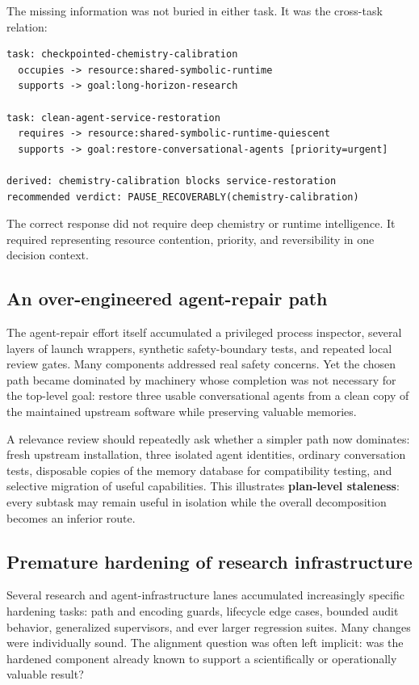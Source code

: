 \documentclass[11pt,letterpaper]{article}
\newcommand{\term}[1]{\textbf{#1}}
\begin{document}
The missing information was not buried in either task. It was the cross-task
relation:

\begin{lstlisting}[style=plain]
task: checkpointed-chemistry-calibration
  occupies -> resource:shared-symbolic-runtime
  supports -> goal:long-horizon-research

task: clean-agent-service-restoration
  requires -> resource:shared-symbolic-runtime-quiescent
  supports -> goal:restore-conversational-agents [priority=urgent]

derived: chemistry-calibration blocks service-restoration
recommended verdict: PAUSE_RECOVERABLY(chemistry-calibration)
\end{lstlisting}

The correct response did not require deep chemistry or runtime intelligence.
It required representing resource contention, priority, and reversibility in
one decision context.

\subsection{An over-engineered agent-repair path}

The agent-repair effort itself accumulated a privileged process inspector,
several layers of launch wrappers, synthetic safety-boundary tests, and
repeated local review gates. Many components addressed real safety concerns.
Yet the chosen path became dominated by machinery whose completion was not
necessary for the top-level goal: restore three usable conversational agents
from a clean copy of the maintained upstream software while preserving
valuable memories.

A relevance review should repeatedly ask whether a simpler path now dominates:
fresh upstream installation, three isolated agent identities, ordinary
conversation tests, disposable copies of the memory database for compatibility
testing, and selective migration of useful capabilities.
This illustrates \term{plan-level staleness}: every subtask may remain useful
in isolation while the overall decomposition becomes an inferior route.

\subsection{Premature hardening of research infrastructure}

Several research and agent-infrastructure lanes accumulated increasingly
specific hardening tasks: path and encoding guards, lifecycle edge cases,
bounded audit behavior, generalized supervisors, and ever larger regression
suites. Many changes were individually sound. The alignment question was
often left implicit: was the hardened component already known to support a
scientifically or operationally valuable result?
\end{document}

